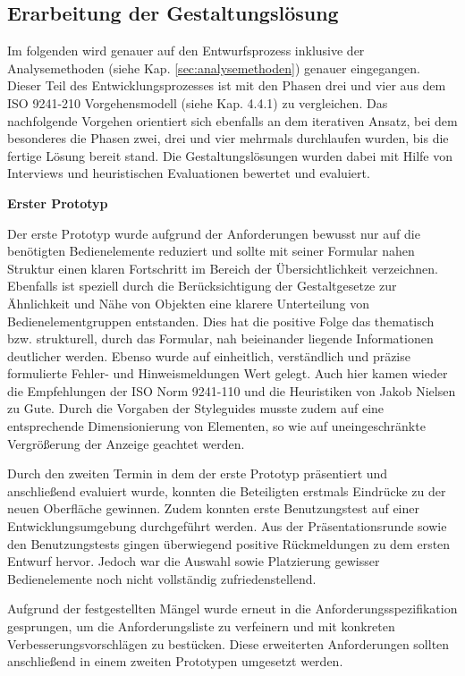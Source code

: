 
\subsection{Erarbeitung der Gestaltungslösung}
Im folgenden wird genauer auf den Entwurfsprozess inklusive der Analysemethoden (siehe Kap. \ref{sec:analysemethoden}) genauer eingegangen. Dieser Teil des Entwicklungsprozesses ist mit den Phasen drei und vier aus dem ISO 9241-210 Vorgehensmodell (siehe Kap. 4.4.1) zu vergleichen. Das nachfolgende Vorgehen orientiert sich ebenfalls an dem iterativen Ansatz, bei dem besonderes die Phasen zwei, drei und vier mehrmals durchlaufen wurden, bis die fertige Lösung bereit stand. Die Gestaltungslösungen wurden dabei mit Hilfe von Interviews und heuristischen Evaluationen bewertet und evaluiert.

\textbf{Erster Prototyp}

Der erste Prototyp wurde aufgrund der Anforderungen bewusst nur auf die benötigten Bedienelemente reduziert und sollte mit seiner Formular nahen Struktur einen klaren Fortschritt im Bereich der Übersichtlichkeit verzeichnen. Ebenfalls ist speziell durch die Berücksichtigung der Gestaltgesetze zur Ähnlichkeit und Nähe von Objekten eine klarere Unterteilung von Bedienelementgruppen entstanden. Dies hat die positive Folge das thematisch bzw. strukturell, durch das Formular, nah beieinander liegende Informationen deutlicher werden. Ebenso wurde auf einheitlich, verständlich und präzise formulierte Fehler- und Hinweismeldungen Wert gelegt. Auch hier kamen wieder die Empfehlungen der ISO Norm 9241-110 und die Heuristiken von Jakob Nielsen zu Gute. Durch die Vorgaben der Styleguides musste zudem auf eine entsprechende Dimensionierung von Elementen, so wie auf uneingeschränkte Vergrößerung der Anzeige geachtet werden.

Durch den zweiten Termin in dem der erste Prototyp präsentiert und anschließend evaluiert wurde, konnten die Beteiligten erstmals Eindrücke zu der neuen Oberfläche gewinnen. Zudem konnten erste Benutzungstest auf einer Entwicklungsumgebung durchgeführt werden. Aus der Präsentationsrunde sowie den Benutzungstests gingen überwiegend positive Rückmeldungen zu dem ersten Entwurf hervor. Jedoch war die Auswahl sowie Platzierung gewisser Bedienelemente noch nicht vollständig zufriedenstellend. 

Aufgrund der festgestellten Mängel wurde erneut in die Anforderungsspezifikation gesprungen, um die Anforderungsliste zu verfeinern und mit konkreten Verbesserungsvorschlägen zu bestücken. Diese erweiterten Anforderungen sollten anschließend in einem zweiten Prototypen umgesetzt werden.

